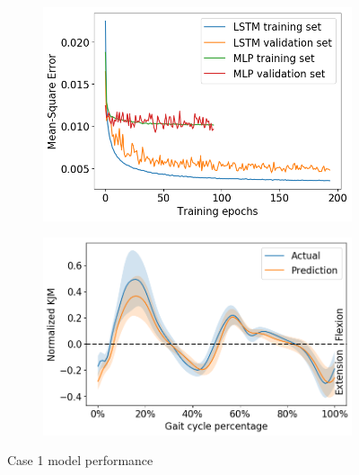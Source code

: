 \documentclass[../main.tex]{subfiles}
\begin{document}
\begin{figure}[!htb]
     \centering
     \begin{subfigure}[b]{0.475\textwidth}
         \centering
         \includegraphics[width=\textwidth]{img/results/training_history/Case1_LSTMvsMLP_training.png}
         \label{fig:case1-training-performance}
     \end{subfigure}
     \hfill
     \begin{subfigure}[b]{0.515\textwidth}
         \centering
         \includegraphics[width=\textwidth]{img/results/test_prediction_evaluation/Case1_LSTM_test_prediction.png}
         \label{fig:case1-prediction-performance}
     \end{subfigure}
    \caption{Case 1 model performance}
    \label{fig:case1-performance-plots}
\end{figure}
\end{document}
